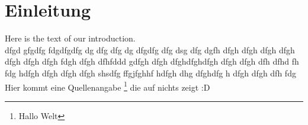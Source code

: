 \section{Einleitung}
Here is the text of our introduction. \\
dfgd gfgdfg fdgdfgdfg dg dfg dfg dg dfgdfg dfg dsg dfg dgfh dfgh dfgh dfgh dfgh dfgh dfgh dfgh fdgh dfgh dfhfddd gdfgh dfgh dfghdfghdfgh dfgh dfgh dfh dfhd fh fdg hdfgh dfgh dfgh dfgh shsdfg ffgjfghhf hdfgh dhg dfghdfg h dfgh dfgh dfh fdg \\
Hier kommt eine Quellenangabe \footnote[1]{Hallo Welt} die auf nichts zeigt :D
